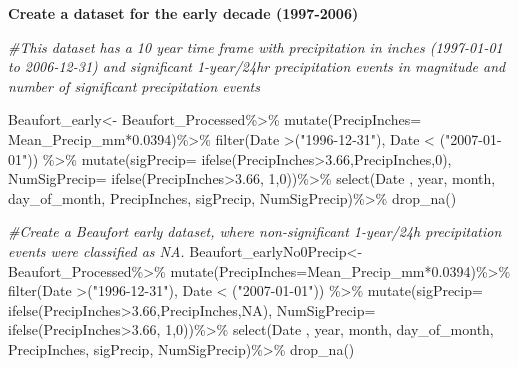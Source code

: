 \documentclass[
  12pt,
]{article}
\newenvironment{Shaded}{\begin{snugshade}}{\end{snugshade}}
\newcommand{\AttributeTok}[1]{\textcolor[rgb]{0.77,0.63,0.00}{#1}}
\newcommand{\CommentTok}[1]{\textcolor[rgb]{0.56,0.35,0.01}{\textit{#1}}}
\newcommand{\ConstantTok}[1]{\textcolor[rgb]{0.00,0.00,0.00}{#1}}
\newcommand{\DecValTok}[1]{\textcolor[rgb]{0.00,0.00,0.81}{#1}}
\newcommand{\FloatTok}[1]{\textcolor[rgb]{0.00,0.00,0.81}{#1}}
\newcommand{\FunctionTok}[1]{\textcolor[rgb]{0.00,0.00,0.00}{#1}}
\newcommand{\NormalTok}[1]{#1}
\newcommand{\OtherTok}[1]{\textcolor[rgb]{0.56,0.35,0.01}{#1}}
\newcommand{\SpecialCharTok}[1]{\textcolor[rgb]{0.00,0.00,0.00}{#1}}
\newcommand{\StringTok}[1]{\textcolor[rgb]{0.31,0.60,0.02}{#1}}
\begin{document}
\textbf{Create a dataset for the early decade (1997-2006)}

\begin{Shaded}
\begin{Highlighting}[]
\CommentTok{\#This dataset has a 10 year time frame with precipitation in inches (1997{-}01{-}01 to 2006{-}12{-}31) and significant 1{-}year/24hr precipitation events in magnitude and number of significant precipitation events}

\NormalTok{Beaufort\_early}\OtherTok{\textless{}{-}}\NormalTok{ Beaufort\_Processed}\SpecialCharTok{\%\textgreater{}\%}
  \FunctionTok{mutate}\NormalTok{(}\AttributeTok{PrecipInches=}\NormalTok{ Mean\_Precip\_mm}\SpecialCharTok{*}\FloatTok{0.0394}\NormalTok{)}\SpecialCharTok{\%\textgreater{}\%}
  \FunctionTok{filter}\NormalTok{(Date }\SpecialCharTok{\textgreater{}}\NormalTok{(}\StringTok{"1996{-}12{-}31"}\NormalTok{), Date }\SpecialCharTok{\textless{}}\NormalTok{ (}\StringTok{"2007{-}01{-}01"}\NormalTok{)) }\SpecialCharTok{\%\textgreater{}\%} 
  \FunctionTok{mutate}\NormalTok{(}\AttributeTok{sigPrecip=} \FunctionTok{ifelse}\NormalTok{(PrecipInches}\SpecialCharTok{\textgreater{}}\FloatTok{3.66}\NormalTok{,PrecipInches,}\DecValTok{0}\NormalTok{),}
         \AttributeTok{NumSigPrecip=} \FunctionTok{ifelse}\NormalTok{(PrecipInches}\SpecialCharTok{\textgreater{}}\FloatTok{3.66}\NormalTok{, }\DecValTok{1}\NormalTok{,}\DecValTok{0}\NormalTok{))}\SpecialCharTok{\%\textgreater{}\%}
  \FunctionTok{select}\NormalTok{(Date , year, month, }
\NormalTok{         day\_of\_month, PrecipInches, sigPrecip, NumSigPrecip)}\SpecialCharTok{\%\textgreater{}\%}
  \FunctionTok{drop\_na}\NormalTok{()}
  
\CommentTok{\#Create a Beaufort early dataset, where non{-}significant 1{-}year/24h precipitation events were classified as NA.}
\NormalTok{Beaufort\_earlyNo0Precip}\OtherTok{\textless{}{-}}\NormalTok{Beaufort\_Processed}\SpecialCharTok{\%\textgreater{}\%}
  \FunctionTok{mutate}\NormalTok{(}\AttributeTok{PrecipInches=}\NormalTok{Mean\_Precip\_mm}\SpecialCharTok{*}\FloatTok{0.0394}\NormalTok{)}\SpecialCharTok{\%\textgreater{}\%}
  \FunctionTok{filter}\NormalTok{(Date }\SpecialCharTok{\textgreater{}}\NormalTok{(}\StringTok{"1996{-}12{-}31"}\NormalTok{), Date }\SpecialCharTok{\textless{}}\NormalTok{ (}\StringTok{"2007{-}01{-}01"}\NormalTok{)) }\SpecialCharTok{\%\textgreater{}\%} 
  \FunctionTok{mutate}\NormalTok{(}\AttributeTok{sigPrecip=} \FunctionTok{ifelse}\NormalTok{(PrecipInches}\SpecialCharTok{\textgreater{}}\FloatTok{3.66}\NormalTok{,PrecipInches,}\ConstantTok{NA}\NormalTok{),}
         \AttributeTok{NumSigPrecip=} \FunctionTok{ifelse}\NormalTok{(PrecipInches}\SpecialCharTok{\textgreater{}}\FloatTok{3.66}\NormalTok{, }\DecValTok{1}\NormalTok{,}\DecValTok{0}\NormalTok{))}\SpecialCharTok{\%\textgreater{}\%}
  \FunctionTok{select}\NormalTok{(Date , year, month, }
\NormalTok{         day\_of\_month, PrecipInches, sigPrecip, NumSigPrecip)}\SpecialCharTok{\%\textgreater{}\%}
  \FunctionTok{drop\_na}\NormalTok{()}


\end{Highlighting}
\end{Shaded}
\end{document}
